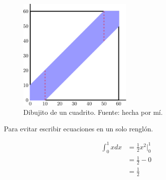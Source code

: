 \documentclass[11pt,article]{memoir} %
\begin{document}
\begin{figure}
    \centering
    \includegraphics[width=0.5\textwidth,keepaspectratio]{cuadrito.pdf}
    \caption{Dibujito de un cuadrito. Fuente: hecha por mí.}
    \label{cuadrito bonito}
\end{figure}

Para evitar escribir ecuaciones en un solo renglón.

\begin{align*}
    \int_0^1 x dx & = \frac{1}{2} x^2 \bigg\vert_0^1 \\
    & = \frac{1}{2} - 0 \\
    & = \frac{1}{2}
\end{align*}
\end{document}
